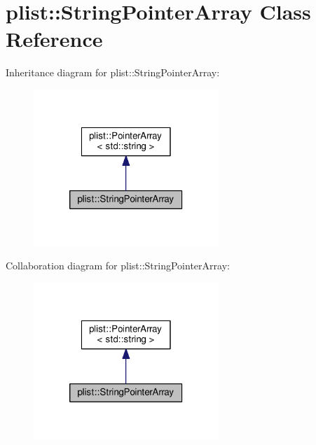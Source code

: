 \hypertarget{classplist_1_1StringPointerArray}{\section{plist\-:\-:String\-Pointer\-Array Class Reference}
\label{classplist_1_1StringPointerArray}
}


Inheritance diagram for plist\-:\-:String\-Pointer\-Array\-:\nopagebreak
\begin{figure}[H]
\begin{center}
\leavevmode
\includegraphics[width=198pt]{classplist_1_1StringPointerArray__inherit__graph}
\end{center}
\end{figure}


Collaboration diagram for plist\-:\-:String\-Pointer\-Array\-:\nopagebreak
\begin{figure}[H]
\begin{center}
\leavevmode
\includegraphics[width=198pt]{classplist_1_1StringPointerArray__coll__graph}
\end{center}
\end{figure}
